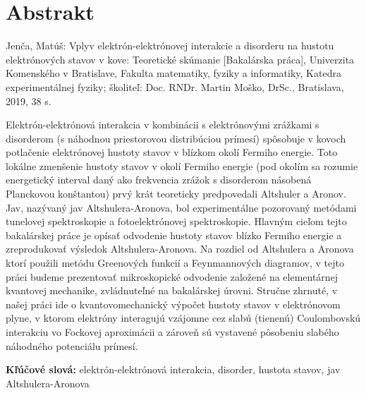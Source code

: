 \thispagestyle{empty}
\section*{Abstrakt}

Jenča, Matúš: Vplyv elektrón-elektrónovej interakcie a disorderu na hustotu elektrónových stavov v kove: Teoretické skúmanie [Bakalárska práca], Univerzita Komenského v Bratislave, Fakulta matematiky, fyziky a informatiky, Katedra experimentálnej fyziky; školiteľ: Doc. RNDr. Martin Moško, DrSc., Bratislava, 2019,  38 s.

Elektrón-elektrónová interakcia v kombinácii s elektrónovými zrážkami s disorderom (s náhodnou priestorovou distribúciou prímesí) spôsobuje
v kovoch potlačenie elektrónovej hustoty stavov v blízkom okolí Fermiho
energie. Toto lokálne zmenšenie hustoty stavov v okolí Fermiho energie (pod okolím sa rozumie energetický interval daný ako frekvencia zrážok s disorderom násobená Planckovou konštantou)
prvý krát teoreticky predpovedali Altshuler a Aronov. Jav, nazývaný jav Altshulera-Aronova, bol experimentálne pozorovaný metódami tunelovej
spektroskopie a fotoelektrónovej spektroskopie. 
Hlavným cieľom tejto bakalárskej práce je
opísať odvodenie hustoty stavov blízko Fermiho energie a zreprodukovať výsledok Altshulera-Aronova. Na rozdiel od Altshulera a Aronova ktorí použili metódu Greenových funkcií a Feynmannových diagramov,
v tejto práci budeme prezentovať mikroskopické odvodenie založené na elementárnej kvantovej mechanike, zvládnuteľné na bakalárskej úrovni. 
Stručne zhrnuté, v našej práci ide o kvantovomechanický výpočet hustoty
stavov v elektrónovom plyne, v ktorom elektróny interagujú vzájomne cez slabú
(tienenú) Coulombovskú interakciu vo Fockovej aproximácii a zároveň sú vystavené pôsobeniu slabého
náhodného potenciálu prímesí.

\begin{flushleft}
\textbf{Kľúčové slová:} elektrón-elektrónová interakcia, disorder, hustota stavov, jav Altshulera-Aronova
\end{flushleft} 